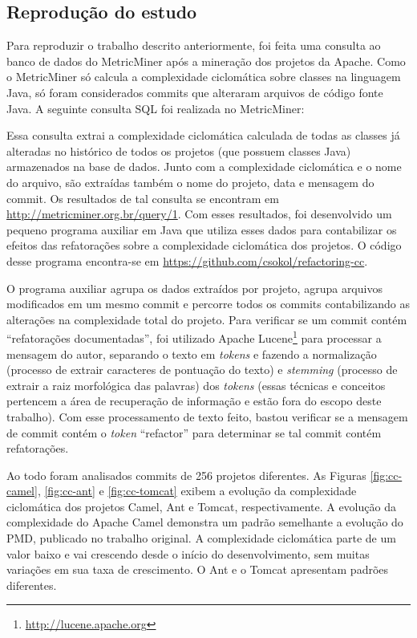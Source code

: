 \documentclass[a4paper, 12pt, twoside]{book}
\begin{document}
        \subsection*{Reprodução do estudo}
        Para reproduzir o trabalho descrito anteriormente, foi feita uma consulta ao banco de dados do MetricMiner após a mineração dos projetos da Apache. Como o MetricMiner só calcula a complexidade ciclomática sobre classes na linguagem Java, só foram considerados commits que alteraram arquivos de código fonte Java. A seguinte consulta SQL foi realizada no MetricMiner:

        

        Essa consulta extrai a complexidade ciclomática calculada de todas as classes já alteradas no histórico de todos os projetos (que possuem classes Java) armazenados na base de dados. Junto com a complexidade ciclomática e o nome do arquivo, são extraídas também o nome do projeto, data e mensagem do commit. Os resultados de tal consulta se encontram em \url{http://metricminer.org.br/query/1}. Com esses resultados, foi desenvolvido um pequeno programa auxiliar em Java que utiliza esses dados para contabilizar os efeitos das refatorações sobre a complexidade ciclomática dos projetos. O código desse programa encontra-se em \url{https://github.com/csokol/refactoring-cc}.

        O programa auxiliar agrupa os dados extraídos por projeto, agrupa arquivos modificados em um mesmo commit e percorre todos os commits contabilizando as alterações na complexidade total do projeto. Para verificar se um commit contém ``refatorações documentadas'', foi utilizado Apache Lucene\footnote{\url{http://lucene.apache.org}} para processar a mensagem do autor, separando o texto em \textit{tokens} e fazendo a normalização (processo de extrair caracteres de pontuação do texto) e \textit{stemming} (processo de extrair a raiz morfológica das palavras) dos \textit{tokens} (essas técnicas e conceitos pertencem a área de recuperação de informação e estão fora do escopo deste trabalho). Com esse processamento de texto feito, bastou verificar se a mensagem de commit contém o  \textit{token} ``refactor'' para determinar se tal commit contém refatorações.

        Ao todo foram analisados commits de 256 projetos diferentes. As Figuras \ref{fig:cc-camel}, \ref{fig:cc-ant} e \ref{fig:cc-tomcat} exibem a evolução da complexidade ciclomática dos projetos Camel, Ant e Tomcat, respectivamente. A evolução da complexidade do Apache Camel demonstra um padrão semelhante a evolução do PMD, publicado no trabalho original. A complexidade ciclomática parte de um valor baixo e vai crescendo desde o início do desenvolvimento, sem muitas variações em sua taxa de crescimento. O Ant e o Tomcat apresentam padrões diferentes. 
\end{document}

